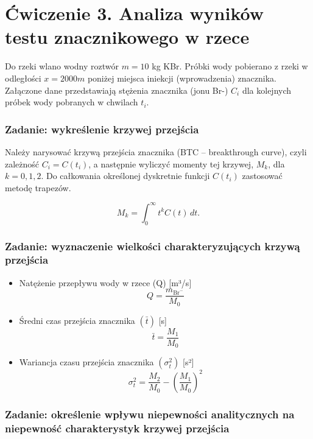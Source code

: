 \documentclass[
  polish,
  letterpaper,
  DIV=11,
  numbers=noendperiod]{scrartcl}
\begin{document}
\section{Ćwiczenie 3. Analiza wyników testu znacznikowego w
rzece}\label{ux107wiczenie-3.-analiza-wynikuxf3w-testu-znacznikowego-w-rzece}

Do rzeki wlano wodny roztwór \(m = 10\) kg KBr. Próbki wody pobierano z
rzeki w odległości \(x = 2000 m\) poniżej miejsca iniekcji
(wprowadzenia) znacznika. Załączone dane przedstawiają stężenia
znacznika (jonu Br-) \(C_i\) dla kolejnych próbek wody pobranych w
chwilach \(t_i\).

\subsubsection{Zadanie: wykreślenie krzywej
przejścia}\label{zadanie-wykreux15blenie-krzywej-przejux15bcia}

Należy narysować krzywą przejścia znacznika (BTC -- breakthrough curve),
czyli zależność \(C_i = C(t_i)\), a następnie wyliczyć momenty tej
krzywej, \(M_k\), dla \(k=0, 1, 2\). Do całkowania określonej dyskretnie
funkcji \(C(t_i)\) zastosować metodę trapezów.

\[
M_k = \int_0^\infty t^k C(t)\,dt.
\]

\subsubsection{Zadanie: wyznaczenie wielkości charakteryzujących krzywą
przejścia}\label{zadanie-wyznaczenie-wielkoux15bci-charakteryzujux105cych-krzywux105-przejux15bcia}

\begin{itemize}
\item
  Natężenie przepływu wody w rzece (Q) {[}m³/s{]} \[
  Q=\frac{m_{\mathrm{Br}^-}}{M_0}
  \]
\item
  Średni czas przejścia znacznika \((\bar{t})\) {[}s{]} \[
  \bar{t}=\frac{M_1}{M_0}
  \]
\item
  Wariancja czasu przejścia znacznika \((\sigma_t^2)\) {[}s²{]}
  \[\sigma_t^2=\frac{M_2}{M_0}-\left(\frac{M_1}{M_0}\right)^2\]
\end{itemize}

\subsubsection{Zadanie: określenie wpływu niepewności analitycznych na
niepewność charakterystyk krzywej
przejścia}\label{zadanie-okreux15blenie-wpux142ywu-niepewnoux15bci-analitycznych-na-niepewnoux15bux107-charakterystyk-krzywej-przejux15bcia}
\end{document}
